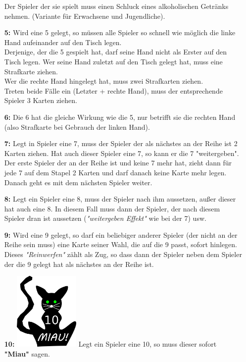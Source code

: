\documentclass{article}
\begin{document}
\begin{itemize}
Der Spieler der sie spielt muss einen Schluck eines alkoholischen Getränks nehmen. (Variante für Erwachsene und Jugendliche).
\item[\textbf{5:}]
Wird eine 5 gelegt, so müssen alle Spieler so schnell wie möglich die linke Hand aufeinander auf den Tisch legen. \\
Derjenige, der die 5 gespielt hat, darf seine Hand nicht als Erster auf den Tisch legen. Wer seine Hand zuletzt auf den Tisch gelegt hat, muss eine Strafkarte ziehen. \\
Wer die rechte Hand hingelegt hat, muss zwei Strafkarten ziehen.\\ Treten beide Fälle ein (Letzter + rechte Hand), muss der entsprechende Spieler 3 Karten ziehen.
\item[\textbf{6:}]
Die 6 hat die gleiche Wirkung wie die 5, nur betrifft sie die rechten Hand (also Strafkarte bei Gebrauch der linken Hand).
\item[\textbf{7:}] 
Legt in Spieler eine 7, muss der Spieler der als nächstes an der Reihe ist 2 Karten ziehen. Hat auch dieser Spieler eine 7, so kann er die 7 "weitergeben". Der erste Spieler der an der Reihe ist und keine 7 mehr hat, zieht dann für jede 7 auf dem Stapel 2 Karten und darf danach keine Karte mehr legen. \\
Danach geht es mit dem nächsten Spieler weiter.
\item[\textbf{8:}]
Legt ein Spieler eine 8, muss der Spieler nach ihm aussetzen, außer dieser hat auch eine 8. In diesem Fall muss dann der Spieler, der nach diesem Spieler dran ist aussetzen (\textit{"weitergeben
Effekt"} wie bei der 7) usw.
\item[\textbf{9:}]
Wird eine 9 gelegt, so darf ein beliebiger anderer Spieler (der nicht an der Reihe sein muss) eine Karte seiner Wahl, die auf die 9 passt, sofort hinlegen. Dieses
\textit{"Reinwerfen"} zählt als Zug, so dass dann der Spieler neben dem Spieler der die 9 gelegt hat als nächstes an der Reihe ist.
\item[\textbf{10:}]
\includegraphics[width=0.25\textwidth]{photos/cat.png}
Legt ein Spieler eine 10, so muss dieser sofort \textbf{"Miau"} sagen. \\

\end{itemize}
\end{document}
